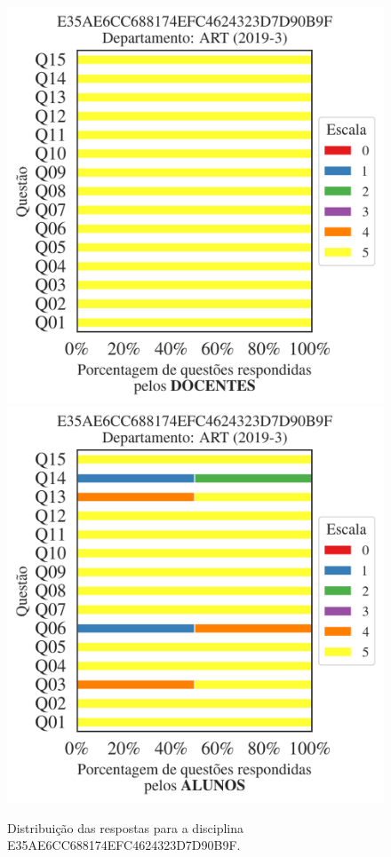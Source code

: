 \documentclass[a4paper,10pt]{article}
\begin{document}
\begin{figure}[h]
\centering
\includegraphics[width=0.485\linewidth]{analise_disciplina_departamento_ART_E35AE6CC688174EFC4624323D7D90B9F_docentes.png}
\includegraphics[width=0.485\linewidth]{analise_disciplina_departamento_ART_E35AE6CC688174EFC4624323D7D90B9F_alunos.png}
\caption{\label{fig:analise_geral_departamento}                Distribuição das respostas para a disciplina E35AE6CC688174EFC4624323D7D90B9F. }
\end{figure}
\end{document}
